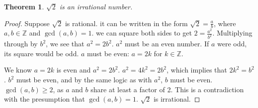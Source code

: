 \documentclass{article}
\newtheorem*{thm}{Theorem}
\begin{document}
\begin{thm}
$\sqrt{2}$ is an irrational number.
\end{thm}
\begin{proof}
Suppose $\sqrt{2}$ is rational. \Therefore it can be written in the form $\sqrt{2} = \frac{a}{b}$, where $a, b \in \mathbb{Z}$ and $\gcd(a,b) = 1$. \Therefore we can square both sides to get $2 = \frac{a^2}{b^2}$. Multiplying through by $b^2$, we see that $a^2 = 2b^2$. \Therefore $a^2$ must be an even number. If $a$ were odd, its square would be odd. \Therefore $a$ must be even: $a=2k$ for $k \in \mathbb{Z}$. 

We know $a=2k$ is even and $a^2 = 2b^2$. \Therefore $a^2 = 4k^2 = 2b^2$, which implies that $2k^2 = b^2$. \Therefore $b^2$ must be even, and by the same logic as with $a^2$, $b$ must be even. \Therefore $\gcd(a,b) \geq 2$, as $a$ and $b$ share at least a factor of 2. This is a contradiction with the presumption that $\gcd(a,b) = 1$. \Therefore $\sqrt{2}$ is irrational.
\end{proof}
\end{document}
